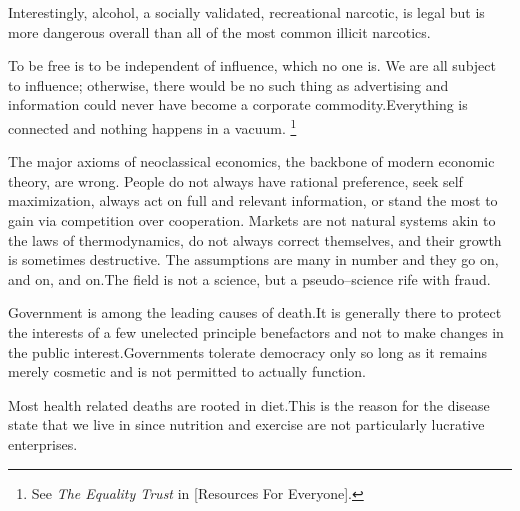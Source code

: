 Interestingly, alcohol, a socially validated, recreational narcotic, is legal but is more dangerous overall than all of the most common illicit narcotics.\footnotecite[extras={ See figure 2.}][nutt2010]


To be free is to be independent of influence, which no one is. We are all subject to influence; otherwise, there would be no such thing as advertising and information could never have become a corporate commodity.\footnotecite[santoso2008] Everything is connected and nothing happens in a vacuum. \footnote{See {\it The Equality Trust} in [Resources For Everyone].}


The major axioms of neoclassical economics, the backbone of modern economic theory, are wrong. People do not always have rational preference, seek self maximization, always act on full and relevant information, or stand the most to gain via competition over cooperation. Markets are not natural systems akin to the laws of thermodynamics, do not always correct themselves, and their growth is sometimes destructive. The assumptions are many in number and they go on, and on, and on.\footnotecite[raj2010]\footnotecite[cobb1999] The field is not a science, but a pseudo--science rife with fraud.


Government is among the leading causes of death. It is generally there to protect the interests of a few unelected principle benefactors and not to make changes in the public interest. Governments tolerate democracy only so long as it remains merely cosmetic and is not permitted to actually function.


Most health related deaths are rooted in diet. This is the reason for the disease state that we live in since nutrition and exercise are not particularly lucrative enterprises.

